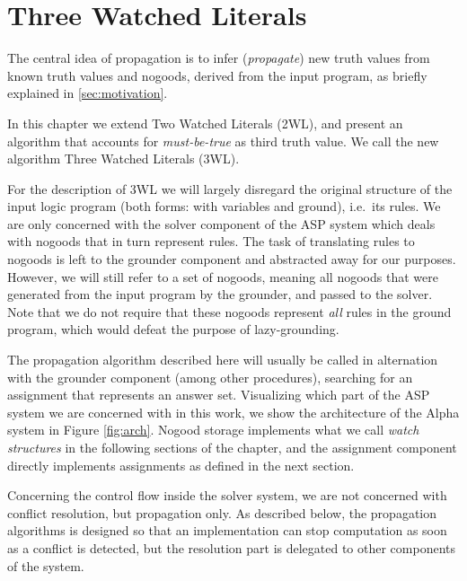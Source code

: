 \documentclass{vutinfth} %
\newcommand{\mbt}{must-be-true\xspace}
\begin{document}
\chapter{Three Watched Literals}
\label{chap:prop}

The central idea of propagation is to infer (\emph{propagate}) new truth values from known truth values and nogoods, derived from the input program, as briefly explained in \ref{sec:motivation}. 

In this chapter we extend Two Watched Literals (2WL), and present an algorithm that accounts for \emph{\mbt} as third truth value. We call the new algorithm Three Watched Literals (3WL).

For the description of 3WL we will largely disregard the original structure of the input logic program (both forms: with variables and ground), i.e.~its rules. We are only concerned with the solver component of the ASP system which deals with nogoods that in turn represent rules. The task of translating rules to nogoods is left to the grounder component and abstracted away for our purposes. However, we will still refer to a set of nogoods, meaning all nogoods that were generated from the input program by the grounder, and passed to the solver. Note that we do not require that these nogoods represent \emph{all} rules in the ground program, which would defeat the purpose of lazy-grounding.

The propagation algorithm described here will usually be called in alternation with the grounder component (among other procedures), searching for an assignment that represents an answer set. Visualizing which part of the ASP system we are concerned with in this work, we show the architecture of the Alpha system in Figure \ref{fig:arch}. Nogood storage implements what we call \emph{watch structures} in the following sections of the chapter, and the assignment component directly implements assignments as defined in the next section.

Concerning the control flow inside the solver system, we are not concerned with conflict resolution, but propagation only. As described below, the propagation algorithms is designed so that an implementation can stop computation as soon as a conflict is detected, but the resolution part is delegated to other components of the system.
\end{document}
